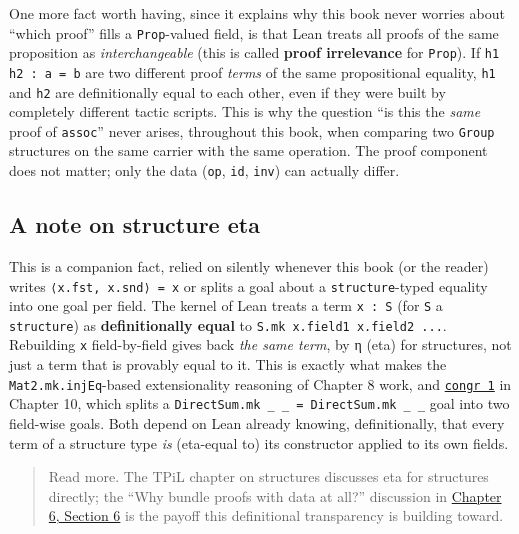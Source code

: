 One more fact worth having, since it explains why this book never worries about ``which proof'' fills a \texttt{Prop}-valued field, is that Lean treats all proofs of the same proposition as \emph{interchangeable} (this is called \textbf{proof irrelevance} for \texttt{Prop}). If \texttt{h1 h2 : a = b} are two different proof \emph{terms} of the same propositional equality, \texttt{h1} and \texttt{h2} are definitionally equal to each other, even if they were built by completely different tactic scripts. This is why the question ``is this the \emph{same} proof of \texttt{assoc}'' never arises, throughout this book, when comparing two \texttt{Group} structures on the same carrier with the same operation. The proof component does not matter; only the data (\texttt{op}, \texttt{id}, \texttt{inv}) can actually differ.

\subsection{A note on structure eta}\label{sec:05-rigor-check:04-defeq-vs-propeq:6}

This is a companion fact, relied on silently whenever this book (or the reader) writes \texttt{⟨x.fst, x.snd⟩ = x} or splits a goal about a \texttt{structure}-typed equality into one goal per field. The kernel of Lean treats a term \texttt{x : S} (for \texttt{S} a \texttt{structure}) as \textbf{definitionally equal} to \texttt{S.mk x.field1 x.field2 ...}. Rebuilding \texttt{x} field-by-field gives back \emph{the same term}, by η (eta) for structures, not just a term that is provably equal to it. This is exactly what makes the \texttt{Mat2.mk.injEq}-based extensionality reasoning of Chapter 8 work, and \href{https://lean-lang.org/doc/reference/latest/Tactic-Proofs/Tactic-Reference/}{\texttt{congr 1}} in Chapter 10, which splits a \texttt{DirectSum.mk \_\allowbreak{} \_\allowbreak{} = DirectSum.mk \_\allowbreak{} \_\allowbreak{}} goal into two field-wise goals. Both depend on Lean already knowing, definitionally, that every term of a structure type \emph{is} (eta-equal to) its constructor applied to its own fields.

\begin{quote}
Read more. The TPiL chapter on structures discusses eta for structures directly; the ``Why bundle proofs with data at all?'' discussion in \hyperref[sec:06-groups:06-why-bundle:1]{Chapter 6, Section 6} is the payoff this definitional transparency is building toward.
\end{quote}


